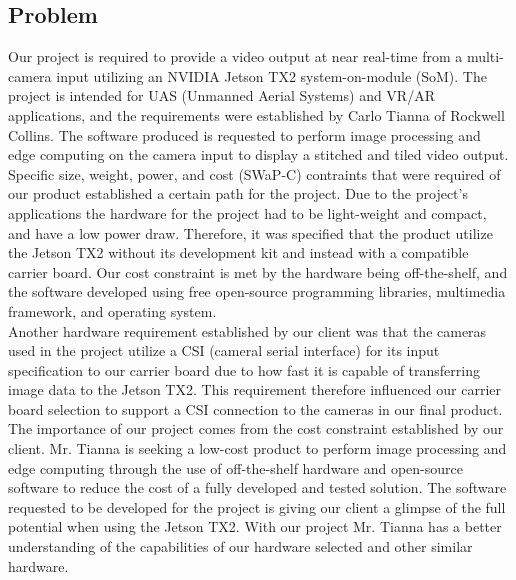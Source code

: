 \subsection{Problem}

Our project is required to provide a video output at near real-time from a 
multi-camera input utilizing an NVIDIA Jetson TX2 system-on-module (SoM). 
The project is intended for UAS (Unmanned Aerial Systems) and VR/AR applications, 
and the requirements were established by Carlo Tianna of Rockwell Collins. 
The software produced is requested to perform image processing and edge computing on the 
camera input to display a stitched and tiled video output.  \\

Specific size, weight, power, and cost (SWaP-C) contraints that were required of our 
product established a certain path for the project. Due to the project's applications  
the hardware for the project had to be light-weight and compact, and have a low power 
draw. Therefore, it was specified that the product utilize the Jetson TX2 without its 
development kit and instead with a compatible carrier board. Our cost constraint is 
met by the hardware being off-the-shelf, and the software developed using free 
open-source programming libraries, multimedia framework, and operating system.  \\

Another hardware requirement established by our client was that the cameras used in
the project utilize a CSI (cameral serial interface) for its input specification to our 
carrier board due to how fast it is capable of transferring image data to the Jetson TX2. 
This requirement therefore influenced our carrier board selection to support a CSI 
connection to the cameras in our final product.  \\

The importance of our project comes from the cost constraint established by our client. 
Mr. Tianna is seeking a low-cost product to perform image processing and edge computing 
through the use of off-the-shelf hardware and open-source software to reduce the cost 
of a fully developed and tested solution. The software requested to be developed for 
the project is giving our client a glimpse of the full potential when using the Jetson 
TX2. With our project Mr. Tianna has a better understanding of the capabilities of our 
hardware selected and other similar hardware.  \\

